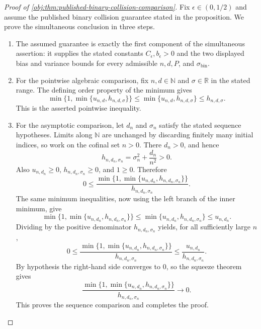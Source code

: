 \begin{proof}[Proof of \cref{obj:thm:published-binary-collision-comparison}]
Fix \(\epsilon\in(0,1/2)\) and assume the published binary collision guarantee stated in the proposition.  We prove the simultaneous conclusion in three steps.

\begin{enumerate}
\item The assumed guarantee is exactly the first component of the simultaneous assertion: it supplies the stated constants \(C_\epsilon,b_\epsilon>0\) and the two displayed bias and variance bounds for every admissible \(n,d,P\), and \(\sigma_{\mathrm{bin}}\). %

\item For the pointwise algebraic comparison, fix \(n,d\in\mathbb N\) and \(\sigma\in\mathbb R\) in the stated range.  The defining order property of the minimum gives
\[
\min\{1,\min\{u_{n,d},h_{n,d,\sigma}\}\}
\le
\min\{u_{n,d},h_{n,d,\sigma}\}
\le
h_{n,d,\sigma}.
\]
This is the asserted pointwise inequality. %

\item For the asymptotic comparison, let \(d_n\) and \(\sigma_n\) satisfy the stated sequence hypotheses.  Limits along \(\mathbb N\) are unchanged by discarding finitely many initial indices, so work on the cofinal set \(n>0\).  There \(d_n>0\), and hence
\[
h_{n,d_n,\sigma_n}
=
\sigma_n^2+\frac{d_n}{n^2}
>
0.
\]
Also \(u_{n,d_n}\ge0\), \(h_{n,d_n,\sigma_n}\ge0\), and \(1\ge0\).  Therefore
\[
0
\le
\frac{\min\{1,\min\{u_{n,d_n},h_{n,d_n,\sigma_n}\}\}}
{h_{n,d_n,\sigma_n}}.
\]
The same minimum inequalities, now using the left branch of the inner minimum, give
\[
\min\{1,\min\{u_{n,d_n},h_{n,d_n,\sigma_n}\}\}
\le
\min\{u_{n,d_n},h_{n,d_n,\sigma_n}\}
\le
u_{n,d_n}.
\]
Dividing by the positive denominator \(h_{n,d_n,\sigma_n}\) yields, for all sufficiently large \(n\),
\[
0
\le
\frac{\min\{1,\min\{u_{n,d_n},h_{n,d_n,\sigma_n}\}\}}
{h_{n,d_n,\sigma_n}}
\le
\frac{u_{n,d_n}}{h_{n,d_n,\sigma_n}}.
\]
By hypothesis the right-hand side converges to \(0\), so the squeeze theorem gives
\[
\frac{\min\{1,\min\{u_{n,d_n},h_{n,d_n,\sigma_n}\}\}}
{h_{n,d_n,\sigma_n}}
\to0 .
\]
This proves the sequence comparison and completes the proof. %
\end{enumerate}
\end{proof}

